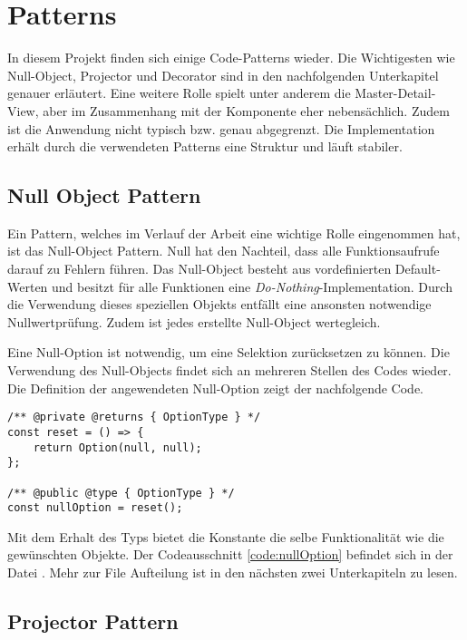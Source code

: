 \section{Patterns}
\label{sec:patterns}

In diesem Projekt finden sich einige Code-Patterns wieder.
Die Wichtigesten wie Null-Object, Projector und Decorator sind in den nachfolgenden Unterkapitel genauer erläutert.
Eine weitere Rolle spielt unter anderem die Master-Detail-View, aber im Zusammenhang mit der Komponente eher nebensächlich.
Zudem ist die Anwendung nicht typisch bzw. genau abgegrenzt.
Die Implementation erhält durch die verwendeten Patterns eine Struktur und läuft stabiler.


\subsection{Null Object Pattern}
\label{sec:nullPattern}

Ein Pattern, welches im Verlauf der Arbeit eine wichtige Rolle eingenommen hat, ist das Null-Object Pattern.
Null hat den Nachteil, dass alle Funktionsaufrufe darauf zu Fehlern führen.
Das Null-Object besteht aus vordefinierten Default-Werten und besitzt für alle Funktionen eine \emph{Do-Nothing}-Implementation.
Durch die Verwendung dieses speziellen Objekts entfällt eine ansonsten notwendige Nullwertprüfung.
Zudem ist jedes erstellte Null-Object wertegleich.

Eine Null-Option ist notwendig, um eine Selektion zurücksetzen zu können. 
Die Verwendung des Null-Objects findet sich an mehreren Stellen des Codes wieder.
Die Definition der angewendeten Null-Option zeigt der nachfolgende Code.

\begin{lstlisting}[style = htmlcssjs, caption = Null-Option Definition, label = code:nullOption]
/** @private @returns { OptionType } */
const reset = () => {
    return Option(null, null);
};

/** @public @type { OptionType } */
const nullOption = reset();
\end{lstlisting}

Mit dem Erhalt des Typs  bietet die Konstante die selbe Funktionalität wie die gewünschten Objekte. 
Der Codeausschnitt \ref{code:nullOption} befindet sich in der Datei .
Mehr zur File Aufteilung ist in den nächsten zwei Unterkapiteln zu lesen.

\subsection{Projector Pattern}
\label{sec:projectorPattern}

